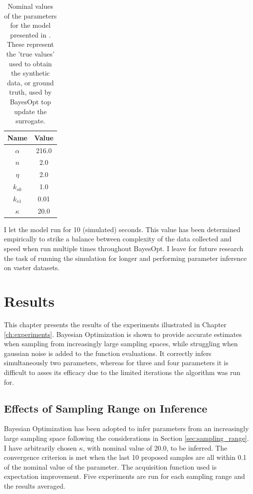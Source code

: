 \documentclass[bsc,frontabs,singlespacing,parskip,deptreport]{infthesis}
\begin{document}
\begin{table}[t]
    \centering
    \begin{tabular}{cc}
    \toprule[1pt]
        \textbf{Name}  & \textbf{Value} \\ \hline
        $\alpha$ & 216.0 \\
        $n$ & 2.0 \\
        $\eta$ & 2.0 \\
        $k_{s0}$ & 1.0 \\
        $k_{s1}$ & 0.01 \\
        $\kappa$ & 20.0 \\
    \bottomrule[1pt]
    \end{tabular}
    \caption{Nominal values of the parameters for the model presented in \cite{doi:10.1073/pnas.0307095101}. These represent the 'true values' used to obtain the synthetic data, or ground truth, used by BayesOpt top update the surrogate.}
    \label{tab:model_params}
\end{table}

I let the model run for 10 (simulated) seconds. This value has been determined empirically to strike a balance between complexity of the data collected and speed when run multiple times throughout BayesOpt. I leave for future research the task of running the simulation for longer and performing parameter inference on vaster datasets.



\chapter{Results}\label{ch:results}
This chapter presents the results of the experiments illustrated in Chapter \ref{ch:experiments}. Bayesian Optimization is shown to provide accurate estimates when sampling from increasingly large sampling spaces, while struggling when gaussian noise is added to the function evaluations. It correctly infers simultaneously two parameters, whereas for three and four parameters it is difficult to asses its efficacy due to the  limited iterations the algorithm was run for.  

\section{Effects of Sampling Range on Inference}\label{sec:results_range}
Bayesian Optimization has been adopted to infer parameters from an increasingly large sampling space following the considerations in Section \ref{sec:sampling_range}. I have arbitrarily chosen $\kappa$, with nominal value of 20.0, to be inferred. The convergence criterion is met when the last 10 proposed samples are all within 0.1 of the nominal value of the parameter. The acquisition function used is expectation improvement. Five experiments are run for each sampling range and the results averaged.
\end{document}
